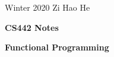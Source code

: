 \documentclass[11pt]{article}
\begin{document}
\noindent
{Winter 2020 \hfill Zi Hao He}


\begin{center}
{\large\bf CS442 Notes}
\end{center}
\bigskip
\noindent
\textbf{Functional Programming} \\
\end{document}

